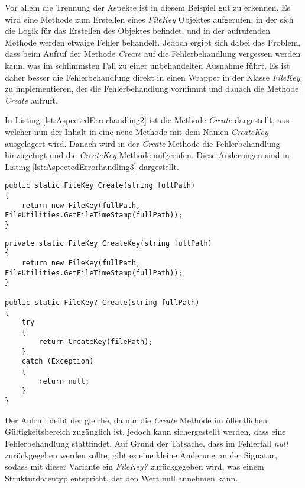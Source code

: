 \SuperPar Vor allem die Trennung der Aspekte ist in diesem Beispiel gut zu erkennen. Es wird eine Methode zum Erstellen eines \textit{FileKey} Objektes aufgerufen, in der sich die Logik für das Erstellen des Objektes befindet, und in der aufrufenden Methode werden etwaige Fehler behandelt. Jedoch ergibt sich dabei das Problem, dass beim Aufruf der Methode \textit{Create} auf die Fehlerbehandlung vergessen werden kann, was im schlimmsten Fall zu einer unbehandelten Ausnahme führt. Es ist daher besser die Fehlerbehandlung direkt in einen Wrapper in der Klasse \textit{FileKey} zu implementieren, der die Fehlerbehandlung vornimmt und danach die Methode \textit{Create} aufruft.

\SuperPar In Listing \ref{lst:AspectedErrorhandling2} ist die Methode \textit{Create} dargestellt, aus welcher nun der Inhalt in eine neue Methode mit dem Namen \textit{CreateKey} ausgelagert wird. Danach wird in der \textit{Create} Methode die Fehlerbehandlung hinzugefügt und die \textit{CreateKey} Methode aufgerufen. Diese Änderungen sind in Listing \ref{lst:AspectedErrorhandling3} dargestellt.

\begin{lstlisting}[language={[Sharp]C}, caption=Create Methode ohne Fehlerbehandlung in der Klasse FileKey, label=lst:AspectedErrorhandling2]
public static FileKey Create(string fullPath)
{
	return new FileKey(fullPath, FileUtilities.GetFileTimeStamp(fullPath));
}
\end{lstlisting}

\begin{lstlisting}[language={[Sharp]C}, caption=Fehlerbehandlung in der Methode Create und eigene Methode für CreateKey, label=lst:AspectedErrorhandling3]
private static FileKey CreateKey(string fullPath)
{
	return new FileKey(fullPath, FileUtilities.GetFileTimeStamp(fullPath));
}
				
public static FileKey? Create(string fullPath)
{
	try
	{
		return CreateKey(filePath);
	}
	catch (Exception)
	{
		return null;
	}
}
\end{lstlisting}

\SuperPar Der Aufruf bleibt der gleiche, da nur die \textit{Create} Methode im öffentlichen Gültigkeitsbereich zugänglich ist, jedoch kann sichergestellt werden, dass eine Fehlerbehandlung stattfindet. Auf Grund der Tatsache, dass im Fehlerfall \textit{null} zurückgegeben werden sollte, gibt es eine kleine Änderung an der Signatur, sodass mit dieser Variante ein \textit{FileKey?} zurückgegeben wird, was einem Strukturdatentyp entspricht, der den Wert null annehmen kann. 

